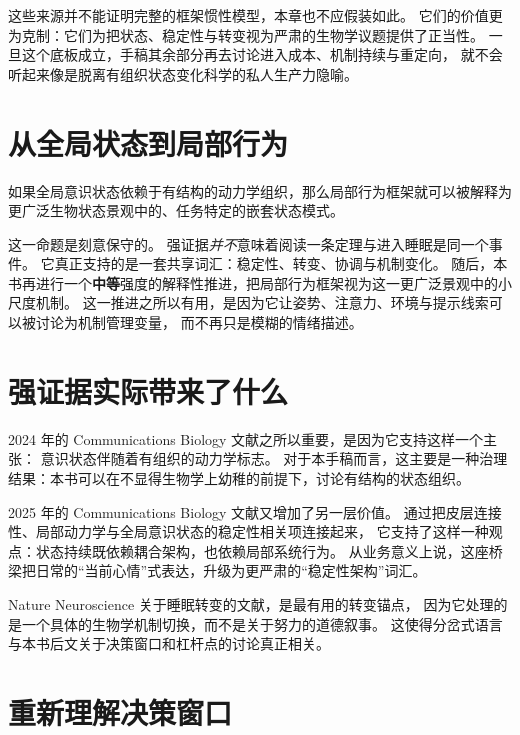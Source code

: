 \begin{discussion}
这些来源并不能证明完整的框架惯性模型，本章也不应假装如此。
它们的价值更为克制：它们为把状态、稳定性与转变视为严肃的生物学议题提供了正当性。
一旦这个底板成立，手稿其余部分再去讨论进入成本、机制持续与重定向，
就不会听起来像是脱离有组织状态变化科学的私人生产力隐喻。
\end{discussion}

\section{从全局状态到局部行为}

\begin{proposition}[嵌套状态解释]
如果全局意识状态依赖于有结构的动力学组织，那么局部行为框架就可以被解释为更广泛生物状态景观中的、任务特定的嵌套状态模式。
\end{proposition}

\begin{discussion}
这一命题是刻意保守的。
强证据\emph{并不}意味着阅读一条定理与进入睡眠是同一个事件。
它真正支持的是一套共享词汇：稳定性、转变、协调与机制变化。
随后，本书再进行一个\textbf{中等}强度的解释性推进，把局部行为框架视为这一更广泛景观中的小尺度机制。
这一推进之所以有用，是因为它让姿势、注意力、环境与提示线索可以被讨论为机制管理变量，
而不再只是模糊的情绪描述。
\end{discussion}

\section{强证据实际带来了什么}

2024 年的 Communications Biology 文献之所以重要，是因为它支持这样一个主张：
意识状态伴随着有组织的动力学标志。
对于本手稿而言，这主要是一种治理结果：本书可以在不显得生物学上幼稚的前提下，讨论有结构的状态组织。

2025 年的 Communications Biology 文献又增加了另一层价值。
通过把皮层连接性、局部动力学与全局意识状态的稳定性相关项连接起来，
它支持了这样一种观点：状态持续既依赖耦合架构，也依赖局部系统行为。
从业务意义上说，这座桥梁把日常的“当前心情”式表达，升级为更严肃的“稳定性架构”词汇。

Nature Neuroscience 关于睡眠转变的文献，是最有用的转变锚点，
因为它处理的是一个具体的生物学机制切换，而不是关于努力的道德叙事。
这使得分岔式语言与本书后文关于决策窗口和杠杆点的讨论真正相关。

\section{重新理解决策窗口}

